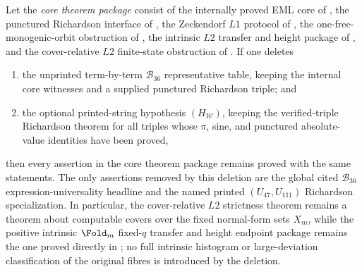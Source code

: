 \begin{theorem}
\label{thm:load-bearing-core-dependency-cut}
Let the \emph{core theorem package} consist of the internally proved EML core of
, the punctured Richardson interface
of , the Zeckendorf \(L1\) protocol of
, the one-free-monogenic-orbit obstruction of
, the intrinsic \(L2\) transfer and height package of
,
and the cover-relative \(L2\) finite-state obstruction of
.  If one deletes
\begin{enumerate}
\item the unprinted term-by-term \(\mathcal B_{36}\) representative table, keeping
  the internal core witnesses and a supplied punctured Richardson triple; and
\item the optional printed-string hypothesis \((H_{\mathcal W})\), keeping the
  verified-triple Richardson theorem for all triples whose \(\pi\), sine, and
  punctured absolute-value identities have been proved,
\end{enumerate}
then every assertion in the core theorem package remains proved with the same
statements.  The only assertions removed by this deletion are the global cited
\(\mathcal B_{36}\) expression-universality headline and the named printed
\((U_{47},U_{111})\) Richardson specialization.  In particular, the cover-relative
\(L2\) strictness theorem remains a theorem about computable covers over the fixed
normal-form sets \(X_m\), while the positive intrinsic \(\Fold_m\) fixed-\(q\)
transfer and height endpoint package remains the one proved directly in
; no full intrinsic histogram or large-deviation classification of
the original fibres is introduced by the deletion.
\end{theorem}

